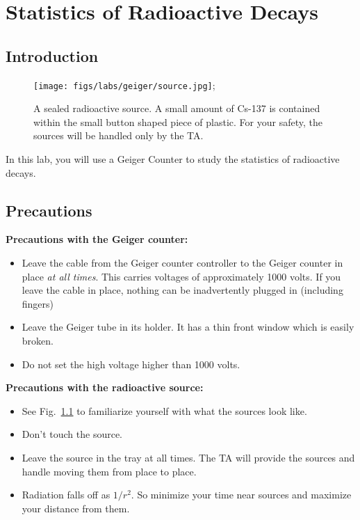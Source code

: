 \chapter{Statistics of Radioactive Decays}


\section{Introduction}

\begin{figure}[htbp]
\begin{center}
 \texttt{[image: figs/labs/geiger/source.jpg]};
\caption{\label{fig:source} A sealed radioactive source.  A small amount of Cs-137 is contained within the small button shaped piece of plastic.  For your safety, the sources will be handled only by the TA.}
\end{center}
\end{figure}

In this lab, you will use a Geiger Counter to study the statistics of radioactive decays.

\section{Precautions}

\noindent
{\bf Precautions with the Geiger counter:}
\begin{itemize}
\item Leave the cable from the Geiger counter controller to the Geiger counter in place {\em at all times}.  This carries voltages of approximately 1000 volts.  If you leave the cable in place, nothing can be inadvertently plugged in (including fingers)
\item Leave the Geiger tube in its holder.  It has a thin front window which is easily broken.
\item Do not set the high voltage higher than 1000 volts.
\end{itemize}

\noindent
{\bf Precautions with the radioactive source:}
\begin{itemize}
\item See Fig.~\ref{fig:source} to familiarize yourself with what the sources look like.
\item Don't touch the source.
\item Leave the source in the tray at all times.  The TA will provide the sources and handle moving them from place to place.
\item Radiation falls off as $1/r^2$.  So minimize your time near sources and maximize your distance from them.
\end{itemize}



